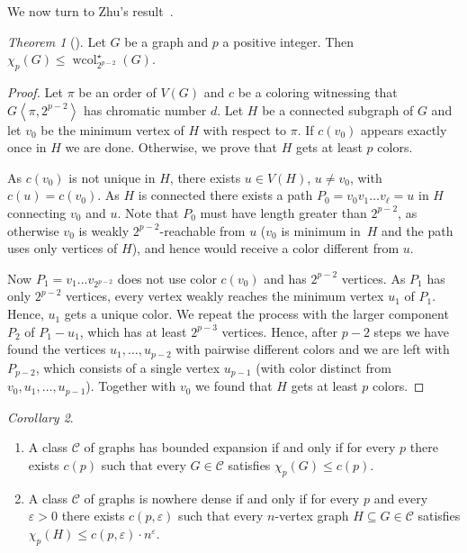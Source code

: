 \documentclass[1p,number,a4paper]{elsarticle}
\theoremstyle{remark}
\newcommand{\Cc}{\mathscr{C}}
\renewcommand{\epsilon}{\varepsilon}
\DeclareMathOperator{\wcol}{wcol}
\newtheorem{theorem}{Theorem}[section]
\newtheorem{corollary}[theorem]{Corollary}
\begin{document}

  
\medskip
We now turn to Zhu's result~\cite{zhu2009colouring}. 

\begin{theorem}[\cite{zhu2009colouring}]
  Let $G$ be a graph and $p$ a positive integer. Then $\chi_p(G)\leq \wcol_{2^{p-2}}^\star(G)$. 
\end{theorem}
\begin{proof}
  Let $\pi$ be an order of $V(G)$ and $c$ be a coloring witnessing that 
  $G\left\langle \pi,2^{p-2}\right\rangle$ has chromatic number $d$. 
  Let $H$ be a connected subgraph of $G$ and let $v_0$ be the minimum vertex 
  of $H$ with respect to $\pi$. If $c(v_0)$ appears exactly once in $H$ we are done. Otherwise, we prove that $H$ gets at least $p$ colors. 

  As $c(v_0)$ is not unique in $H$, there exists $u\in V(H)$, $u\neq v_0$, with $c(u)=c(v_0)$. As $H$ is connected there exists a path $P_0=v_0v_1\ldots v_\ell=u$ in $H$ connecting $v_0$ and $u$. Note that $P_0$ must have length greater than $2^{p-2}$, as otherwise $v_0$ is weakly $2^{p-2}$-reachable from $u$ ($v_0$ is minimum in~$H$ and the path uses only vertices of $H$), and hence would receive a color different from $u$. 

  Now $P_1=v_1\ldots v_{2^{p-2}}$ does not use color $c(v_0)$ and has $2^{p-2}$ vertices. As $P_1$ has only $2^{p-2}$ vertices, every vertex weakly reaches the minimum vertex $u_1$ of $P_1$. Hence, $u_1$ gets a unique color. We repeat the process with the larger component $P_2$ of $P_1-u_1$, which has at least $2^{p-3}$ vertices. Hence, after $p-2$ steps we have found the vertices $u_1,\ldots, u_{p-2}$ with pairwise different colors and we are left with $P_{p-2}$, which consists of a single vertex $u_{p-1}$ (with color distinct from $v_0,u_1,\dots,u_{p-1}$). Together with $v_0$ we found that $H$ gets at least $p$ colors. 
\end{proof}

\begin{corollary}
  \mbox{}
  \begin{enumerate}
    \item A class $\Cc$ of graphs has bounded expansion if and only if for every $p$ there exists $c(p)$ such that every $G\in \Cc$ satisfies $\chi_p(G)\leq c(p)$. 
    \item A class $\Cc$ of graphs is nowhere dense if and only if for every $p$ and every $\epsilon>0$ there exists $c(p,\epsilon)$ such that every $n$-vertex graph $H\subseteq G\in \Cc$ satisfies $\chi_p(H)\leq c(p,\epsilon)\cdot n^\epsilon$. 
  \end{enumerate}
\end{corollary}
\end{document}
